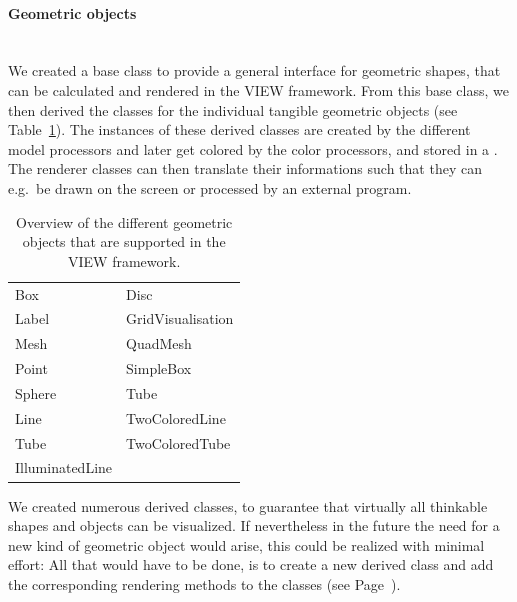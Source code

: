 \paragraph{Geometric objects}
\hspace*{\fill}\\
\label{geometric_objects}
We created a base class  to provide a general interface for geometric 
shapes, that can be calculated and rendered in the VIEW framework. 
From this base class, we then derived the classes for the individual tangible geometric 
objects (see Table~\ref{tab:go}).
The instances of these derived classes are created by the different model processors and 
later get colored by the color processors, and stored in a . 
The renderer classes can then translate their informations such that they can e.g.\ be 
drawn on the screen or processed by an external program.
\begin{table} [ht] %
\centering
\begin{tabular} {|l|l|}
\hline
Box & Disc\\
Label & GridVisualisation\\
Mesh & QuadMesh\\
Point & SimpleBox\\
Sphere & Tube\\
Line & TwoColoredLine \\
Tube & TwoColoredTube\\
IlluminatedLine& \\
\hline
\end{tabular}
\caption{Overview of the different geometric objects that are supported in the VIEW 
	framework.}
\label{tab:go}
\end{table}

We created numerous derived  classes, to guarantee that virtually
all thinkable shapes and objects can be visualized. 
If nevertheless in the future the need for a new kind of geometric object would arise, 
this could be realized with minimal effort:
All that would have to be done, is to create a new derived  class and 
add the corresponding rendering methods to the  classes 
(see Page~\pageref{renderer}).

\label{representation}
